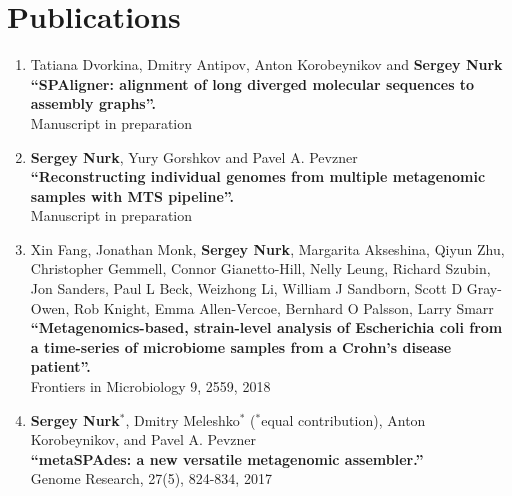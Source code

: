 \section{Publications}
\vspace*{-.7cm}
%
\begin{enumerate}

\item
Tatiana Dvorkina, Dmitry Antipov, Anton Korobeynikov and \textbf{Sergey Nurk}\\
\textbf{``SPAligner: alignment of long diverged molecular sequences to assembly graphs''.}\\
Manuscript in preparation

\item
\textbf{Sergey Nurk}, Yury Gorshkov and Pavel A. Pevzner\\
\textbf{``Reconstructing individual genomes from multiple metagenomic samples with MTS pipeline''.}\\
Manuscript in preparation

\item
Xin Fang, Jonathan Monk, \textbf{Sergey Nurk}, Margarita Akseshina, Qiyun Zhu, Christopher Gemmell, Connor Gianetto-Hill, Nelly Leung, Richard Szubin, Jon Sanders, Paul L Beck, Weizhong Li, William J Sandborn, Scott D Gray-Owen, Rob Knight, Emma Allen-Vercoe, Bernhard O Palsson, Larry Smarr\\
\textbf{``Metagenomics-based, strain-level analysis of Escherichia coli from a time-series of microbiome samples from a Crohn’s disease patient''.}\\
Frontiers in Microbiology 9, 2559, 2018

\item 
\textbf{Sergey Nurk}$^*$, Dmitry Meleshko$^*$ ($^*$equal contribution), Anton Korobeynikov, and Pavel A. Pevzner \\
\textbf{``metaSPAdes: a new versatile metagenomic assembler.''} \\
Genome Research, 27(5), 824-834, 2017 


\end{enumerate}
